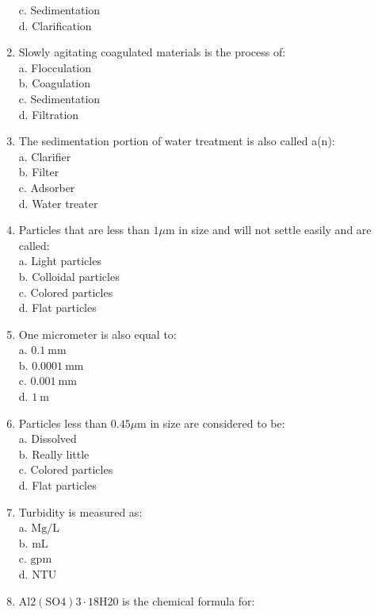 \begin{enumerate}
c. Sedimentation\\
d. Clarification\\
\item Slowly agitating coagulated materials is the process of:\\
a. Flocculation\\
b. Coagulation\\
c. Sedimentation\\
d. Filtration\\
\item The sedimentation portion of water treatment is also called a(n):\\
a. Clarifier\\
b. Filter\\
c. Adsorber\\
d. Water treater\\
\item Particles that are less than $1 \mu \mathrm{m}$ in size and will not settle easily and are called:\\
a. Light particles\\
b. Colloidal particles\\
c. Colored particles\\
d. Flat particles\\
\item One micrometer is also equal to:\\
a. $0.1 \mathrm{~mm}$\\
b. $0.0001 \mathrm{~mm}$\\
c. $0.001 \mathrm{~mm}$\\
d. $1 \mathrm{~m}$\\
\item Particles less than $0.45 \mu \mathrm{m}$ in size are considered to be:\\
a. Dissolved\\
b. Really little\\
c. Colored particles\\
d. Flat particles\\
\item Turbidity is measured as:\\
a. $\mathrm{Mg} / \mathrm{L}$\\
b. $\mathrm{mL}$\\
c. $\mathrm{gpm}$\\
d. NTU\\
\item $\mathrm{Al} 2(\mathrm{SO} 4) 3 \cdot 18 \mathrm{H} 20$ is the chemical formula for:\\

\end{enumerate}
